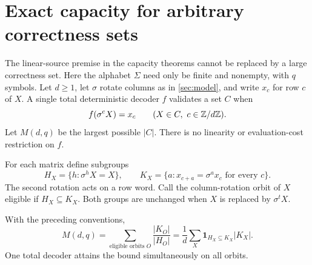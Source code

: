 \section{Exact capacity for arbitrary correctness sets}\label{sec:set-capacity}

The linear-source premise in the capacity theorems cannot be replaced by a
large correctness set. Here the alphabet $\Sigma$ need only be finite and
nonempty, with $q$ symbols. Let $d\ge1$, let $\sigma$ rotate columns as in
\cref{sec:model}, and write $x_c$ for row $c$ of $X$. A single total
deterministic decoder $f$ validates a set $C$ when
\[
 f(\sigma^cX)=x_c\qquad(X\in C,\ c\in\Z/d\Z).
\]
Let $M(d,q)$ be the largest possible $|C|$. There is no linearity or
evaluation-cost restriction on $f$.

For each matrix define subgroups
\[
 H_X=\{h:\sigma^hX=X\},\qquad
 K_X=\{a:x_{c+a}=\sigma^a x_c\text{ for every }c\}.
\]
The second rotation acts on a row word. Call the column-rotation orbit of
$X$ eligible if $H_X\subseteq K_X$. Both groups are unchanged when $X$ is
replaced by $\sigma^tX$.

\begin{theorem}\label{thm:set-capacity}
With the preceding conventions,
\begin{equation}\label{eq:set-capacity}
 M(d,q)=\sum_{\text{eligible orbits }O}\frac{|K_O|}{|H_O|}
       =\frac1d\sum_X\mathbf 1_{H_X\subseteq K_X}|K_X|.
\end{equation}
One total decoder attains the bound simultaneously on all orbits.
\end{theorem}

